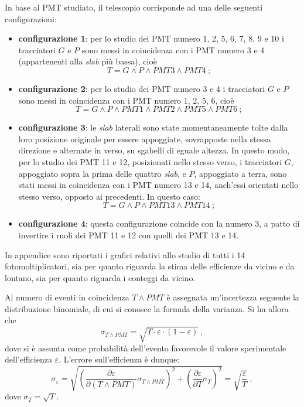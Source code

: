 \documentclass[10pt, oneside, a4paper]{article}   	%
\renewcommand{\epsilon}{\varepsilon}			%
\begin{document}
In base al PMT studiato, il telescopio corrisponde ad una delle seguenti configurazioni:
\begin{itemize}
	\item \textbf{configurazione 1}: per lo studio dei PMT numero 1, 2, 5, 6, 7, 8, 9 e 10 i tracciatori $G$ e $P$ sono messi in coincidenza con i PMT numero 3 e 4 (appartenenti alla \emph{slab} più bassa), cioè \[T = G\wedge P \wedge PMT3 \wedge PMT4 \ ;\]
%
	\item \textbf{configurazione 2}: per lo studio dei PMT numero 3 e 4 i tracciatori $G$ e $P$ sono messi in coincidenza con i PMT numero 1, 2, 5, 6, cioè \[T = G\wedge P \wedge PMT1 \wedge PMT2 \wedge PMT5 \wedge PMT6 \ ; \]
%
	\item \textbf{configurazione 3}: le \emph{slab} laterali sono state momentaneamente tolte dalla loro posizione originale per essere appoggiate, sovrapposte nella stessa direzione e alternate in verso, su sgabelli di eguale altezza. In questo modo, per lo studio dei PMT 11 e 12, posizionati nello stesso verso, i tracciatori $G$, appoggiato sopra la prima delle quattro \emph{slab}, e $P$, appoggiato a terra, sono stati messi in coincidenza con i PMT numero 13 e 14, anch'essi orientati nello stesso verso, opposto ai precedenti. In questo caso: \[T = G\wedge P \wedge PMT13 \wedge PMT14 \ ;\]
%
	\item \textbf{configurazione 4}: questa configurazione coincide con la numero 3, a patto di invertire i ruoli dei PMT 11 e 12 con quelli dei PMT 13 e 14. 
\end{itemize}
In appendice sono riportati i grafici relativi allo studio di tutti i 14 fotomoltiplicatori, sia per quanto riguarda la stima delle efficienze da vicino e da lontano, sia per quanto riguarda i conteggi da vicino.

Al numero di eventi in coincidenza $T\wedge PMT$ è assegnata un'incertezza seguente la distribuzione binomiale, di cui si conosce la formula della varianza.  
Si ha allora che 
\[\sigma_{T\wedge PMT} = \sqrt{T \cdot \varepsilon \cdot  (1-\varepsilon)} \ , \]
dove si è assunta come probabilità dell'evento favorevole il valore sperimentale dell'efficienza $\varepsilon$.
L'errore sull'efficienza è dunque:
$$\sigma_\epsilon=\sqrt{ \left(\frac{\partial\epsilon}{\partial (T\wedge PMT)}\sigma_{T\wedge PMT}\right)^2 + \left(\frac{\partial \epsilon}{\partial T}\sigma_T\right)^2 }=\sqrt{\frac{\epsilon}{T}} \ , $$
dove $\sigma_T = \sqrt{T}$.

%
\end{document}
